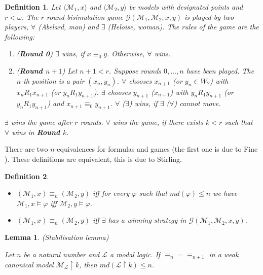 \documentclass[a4paper]{article}
\theoremstyle{defin}
\newtheorem{defin}{Definition}
\theoremstyle{theorem}
\theoremstyle{prop}
\theoremstyle{lemma}
\newtheorem{lemma}{Lemma}
\theoremstyle{fact}
\theoremstyle{ex}
\theoremstyle{col}
\theoremstyle{claim}
\begin{document}
\begin{defin}
  Let $\langle \mathcal{M}_1, x \rangle$ and $\langle \mathcal{M}_2, y \rangle$ be models with designated points and $r < \omega$. The $r$-round bisimulation game $\mathcal{G}(\mathcal{M}_1, \mathcal{M}_2, x, y)$ is played by two players, $\forall$ (Abelard, man) and $\exists$ (Heloise, woman). The rules of the game are the following:
  \begin{enumerate}
    \item ({\bf Round 0}) $\exists$ wins, if $x \equiv_0 y$. Otherwise, $\forall$ wins.
    \item ({\bf Round $n+1$}) Let $n + 1 < r$. Suppose rounds $0, \dots, n$ have been played.
    The $n$-th position is a pair $(x_n, y_n)$.
    $\forall$ chooses $x_{n + 1}$ (or $y_n \in W_2$) with $x_n R_1 x_{n + 1}$ (or $y_n R_1 y_{n + 1}$). $\exists$ chooses $y_{n + 1}$ ($x_{n + 1}$) with $y_n R_1 y_{n + 1}$ (or $y_n R_1 y_{n + 1}$) and $x_{n + 1} \equiv_0 y_{n + 1}$.
    $\forall$ ($\exists$) wins, if $\exists$ ($\forall$) cannot move.
  \end{enumerate}
  $\exists$ wins the game after $r$ rounds. $\forall$ wins the game, if there exists $k < r$ such that $\forall$ wins in {\bf Round $k$}.
\end{defin}

There are two $n$-equivalences for formulas and games (the first one is due to Fine \cite{fine1974logics}). These definitions are equivalent, this is due to Stirling.

\begin{defin}
  $ $

  \begin{itemize}
  \item $(\mathcal{M}_1, x) \equiv_n (\mathcal{M}_2, y)$ iff for every $\varphi$ such that
  $md(\varphi) \leq n$ we have $\mathcal{M}_1, x \models \varphi$ iff $\mathcal{M}_2, y \models \varphi$.
  \item $(\mathcal{M}_1, x) \equiv_n (\mathcal{M}_2, y)$ iff $\exists$ has a winning strategy in $\mathcal{G}(\mathcal{M}_1, \mathcal{M}_2, x, y)$.
  \end{itemize}
\end{defin}

\begin{lemma} (Stabilisation lemma)

  Let $n$ be a natural number and $\mathcal{L}$ a modal logic.
  If $\equiv_n = \equiv_{n + 1}$ in a weak canonical model $\mathcal{M}_{\mathcal{L}} \upharpoonright k$, then $md(\mathcal{L} \upharpoonright k) \leq n$.
\end{lemma}
\end{document}
